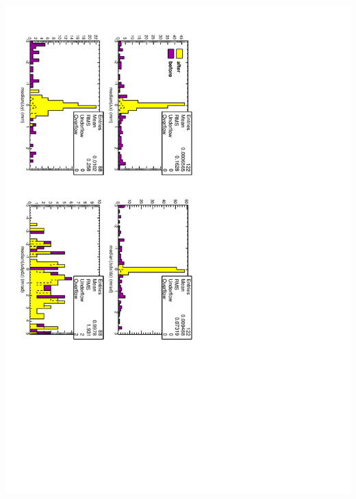 \documentclass[compress]{beamer}
\begin{document}
\begin{frame}
\begin{columns}
\includegraphics[height=\linewidth, angle=90]{NOV4DT_median_goodDT.pdf}
\end{columns}
\end{frame}
\end{document}
